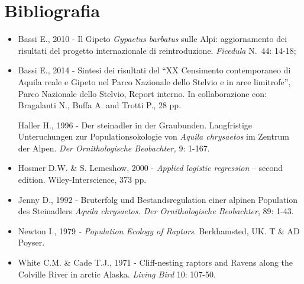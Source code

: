 \section*{Bibliografia}
\begin{itemize}\itemsep0pt
	\item Bassi E., 2010 -\textbf{ }Il Gipeto \textit{Gypaetus barbatus} sulle
Alpi: aggiornamento dei risultati del progetto internazionale di
reintroduzione. \textit{Ficedula} N.~44: 14-18; 

	\item Bassi E., 2014 - Sintesi dei risultati del {\textquotedblleft}XX
Censimento contemporaneo di Aquila reale e Gipeto nel Parco Nazionale
dello Stelvio e in aree limitrofe{\textquotedblright}, Parco Nazionale
dello Stelvio, Report interno. In collaborazione con: Bragalanti N.,
Buffa A. and Trotti P., 28 pp.

Haller H., 1996 \textsc{{}- }Der steinadler in der Graubunden.
Langfristige Unteruchungen zur Populationsokologie von \textit{Aquila
chrysaetos }im Zentrum der Alpen. \textit{Der Ornithologische
Beobachter, }9: 1-167. 

	\item Hosmer D.W. \& S. Lemeshow, 2000 - \textit{Applied logistic regression}
-- second edition. Wiley-Interscience, 373 pp. 

	\item Jenny D.,\textsc{ 1992 - }Bruterfolg und Bestandsregulation einer
alpinen Population des Steinadlers \textit{Aquila chrysaetos.}
\textit{Der Ornithologische Beobachter}\textsc{, 89: 1-43. }

	\item Newton I., 1979 \textit{{}- }\textit{Population Ecology of Raptors}.
Berkhamsted, UK. T \& AD Poyser.

	\item White C.M. \& Cade T.J., 1971 - Cliff-nesting raptors and Ravens along
the Colville River in arctic Alaska. \textit{Living Bird} 10: 107-50.
\end{itemize}
